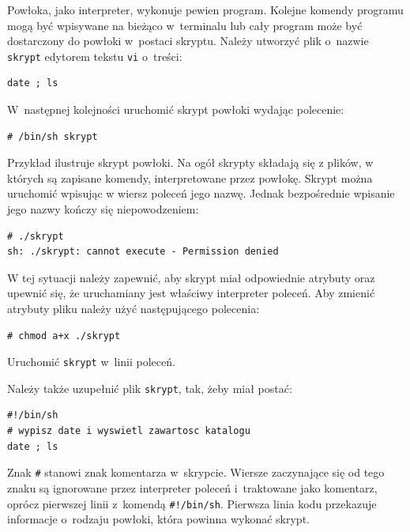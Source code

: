 \begin{example} \label{ex:prostakomenda7} 


Powłoka, jako interpreter, wykonuje pewien program.  Kolejne komendy programu mogą być wpisywane na bieżąco w~terminalu lub cały program może być dostarczony do powłoki w~postaci skryptu. Należy utworzyć plik o~nazwie \lstinline[style=MyBashStyle]{skrypt} edytorem tekstu \lstinline[style=MyBashStyle]{vi} o~treści:

\begin{lstlisting}[style=MyBashStyle]
date ; ls
\end{lstlisting}

W~następnej kolejności uruchomić skrypt powłoki wydając polecenie: 

\begin{lstlisting}[style=MyBashStyle]
# /bin/sh skrypt
\end{lstlisting}

Przykład ilustruje skrypt powłoki. Na ogół skrypty składają się z plików, w których są zapisane komendy, interpretowane przez powłokę. Skrypt można uruchomić wpisując w wiersz poleceń jego nazwę. Jednak bezpośrednie wpisanie jego nazwy kończy się niepowodzeniem:

\begin{lstlisting}[style=MyBashStyle]
# ./skrypt
sh: ./skrypt: cannot execute - Permission denied
\end{lstlisting}

W tej sytuacji należy zapewnić, aby skrypt miał odpowiednie atrybuty oraz upewnić się, że uruchamiany jest właściwy interpreter poleceń. Aby zmienić atrybuty pliku należy użyć następującego polecenia:

\begin{lstlisting}[style=MyBashStyle]
# chmod a+x ./skrypt
\end{lstlisting}

Uruchomić \lstinline[style=MyBashStyle]{skrypt} w~linii poleceń. 
\end{example}


\begin{example}\label{ex:prostakomenda8} 


Należy także uzupełnić plik \lstinline[style=MyBashStyle]{skrypt}, tak, żeby miał postać:

\begin{lstlisting}[style=MyBashStyle]
#!/bin/sh
# wypisz date i wyswietl zawartosc katalogu
date ; ls
\end{lstlisting}

Znak \lstinline[style=MyBashStyle]{#} stanowi znak komentarza w~skrypcie. Wiersze zaczynające się od tego znaku są ignorowane przez interpreter poleceń i~traktowane jako komentarz, oprócz pierwszej linii z~komendą \lstinline[style=MyBashStyle]{#!/bin/sh}. Pierwsza linia kodu przekazuje informacje o~rodzaju powłoki, która powinna wykonać skrypt. 
\end{example}


